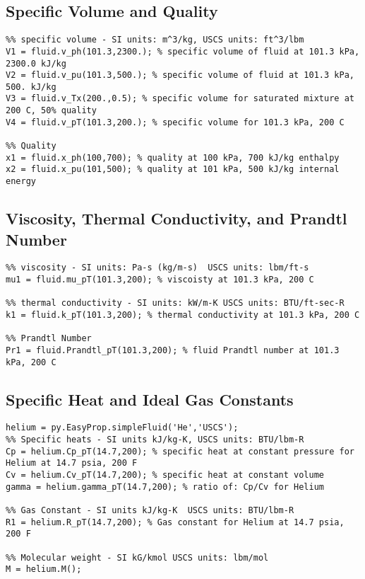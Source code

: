 \subsection{Specific Volume and Quality}
\begin{fullwidth}
\begin{lstlisting}
%% specific volume - SI units: m^3/kg, USCS units: ft^3/lbm
V1 = fluid.v_ph(101.3,2300.); % specific volume of fluid at 101.3 kPa, 2300.0 kJ/kg
V2 = fluid.v_pu(101.3,500.); % specific volume of fluid at 101.3 kPa, 500. kJ/kg
V3 = fluid.v_Tx(200.,0.5); % specific volume for saturated mixture at 200 C, 50% quality
V4 = fluid.v_pT(101.3,200.); % specific volume for 101.3 kPa, 200 C

%% Quality
x1 = fluid.x_ph(100,700); % quality at 100 kPa, 700 kJ/kg enthalpy
x2 = fluid.x_pu(101,500); % quality at 101 kPa, 500 kJ/kg internal energy

\end{lstlisting}
\end{fullwidth}

\subsection{Viscosity, Thermal Conductivity, and Prandtl Number}
\begin{fullwidth}
\begin{lstlisting}
%% viscosity - SI units: Pa-s (kg/m-s)  USCS units: lbm/ft-s
mu1 = fluid.mu_pT(101.3,200); % viscoisty at 101.3 kPa, 200 C

%% thermal conductivity - SI units: kW/m-K USCS units: BTU/ft-sec-R
k1 = fluid.k_pT(101.3,200); % thermal conductivity at 101.3 kPa, 200 C

%% Prandtl Number 
Pr1 = fluid.Prandtl_pT(101.3,200); % fluid Prandtl number at 101.3 kPa, 200 C
\end{lstlisting}
\end{fullwidth}

\subsection{Specific Heat and Ideal Gas Constants}
\begin{fullwidth}
\begin{lstlisting}
helium = py.EasyProp.simpleFluid('He','USCS');
%% Specific heats - SI units kJ/kg-K, USCS units: BTU/lbm-R
Cp = helium.Cp_pT(14.7,200); % specific heat at constant pressure for Helium at 14.7 psia, 200 F
Cv = helium.Cv_pT(14.7,200); % specific heat at constant volume
gamma = helium.gamma_pT(14.7,200); % ratio of: Cp/Cv for Helium

%% Gas Constant - SI units kJ/kg-K  USCS units: BTU/lbm-R
R1 = helium.R_pT(14.7,200); % Gas constant for Helium at 14.7 psia, 200 F 

%% Molecular weight - SI kG/kmol USCS units: lbm/mol
M = helium.M(); 

\end{lstlisting}
\end{fullwidth}

